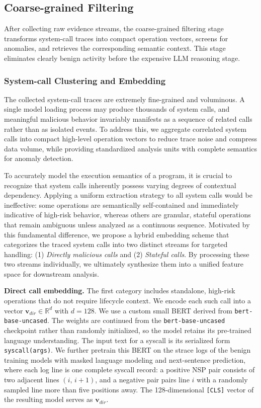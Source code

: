 \subsection{Coarse-grained Filtering}

After collecting raw evidence streams, the coarse-grained filtering stage transforms system-call traces into compact operation vectors, screens for anomalies, and retrieves the corresponding semantic context. This stage eliminates clearly benign activity before the expensive LLM reasoning stage.

\subsubsection{System-call Clustering and Embedding}

The collected system-call traces are extremely fine-grained and voluminous. A single model loading process may produce thousands of system calls, and meaningful malicious behavior invariably manifests as a sequence of related calls rather than as isolated events. To address this, we aggregate correlated system calls into compact high-level operation vectors to reduce trace noise and compress data volume, while providing standardized analysis units with complete semantics for anomaly detection.

To accurately model the execution semantics of a program, it is crucial to recognize that system calls inherently possess varying degrees of contextual dependency. Applying a uniform extraction strategy to all system calls would be ineffective: some operations are semantically self-contained and immediately indicative of high-risk behavior, whereas others are granular, stateful operations that remain ambiguous unless analyzed as a continuous sequence. Motivated by this fundamental difference, we propose a hybrid embedding scheme that categorizes the traced system calls into two distinct streams for targeted handling: (1) \emph{Directly malicious calls} and (2) \emph{Stateful calls}. By processing these two streams individually, we ultimately synthesize them into a unified feature space for downstream analysis.

\noindent \textbf{Direct call embedding.}
The first category includes standalone, high-risk operations that do not require lifecycle context. We encode each such call into a vector $\mathbf{v}_{\textit{dir}} \in \mathbb{R}^{d}$ with $d=128$. We use a custom small BERT derived from \texttt{bert-base-uncased}. The weights are continued from the \texttt{bert-base-uncased} checkpoint rather than randomly initialized, so the model retains its pre-trained language understanding. The input text for a syscall is its serialized form \texttt{syscall(args)}. We further pretrain this BERT on the strace logs of the benign training models with masked language modeling and next-sentence prediction, where each log line is one complete syscall record: a positive NSP pair  consists of two adjacent lines $(i,\, i{+}1)$, and a negative pair pairs line $i$ with a randomly sampled line more than five positions away. The 128-dimensional \texttt{[CLS]} vector of the resulting model serves as $\mathbf{v}_{\textit{dir}}$.

